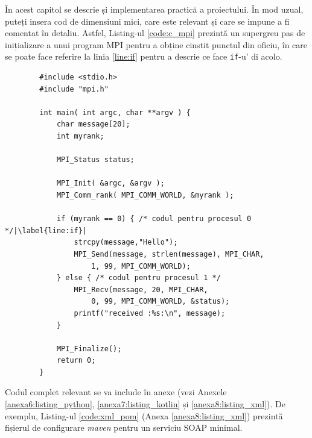 În acest capitol se descrie și implementarea practică a proiectului. În mod uzual, puteți insera cod de dimensiuni mici, care este relevant și care se impune a fi comentat în detaliu. Astfel, Listing-ul \ref{code:c_mpi} prezintă un supergreu pas de inițializare a unui program MPI pentru a obține cinstit punctul din oficiu, în care se poate face referire la linia \ref{line:if} pentru a descrie ce face \verb|if|-u' di acolo.

\begin{code}
    \begin{verbatim}
        #include <stdio.h>
        #include "mpi.h"
        
        int main( int argc, char **argv ) {
        	char message[20];
        	int myrank;	
        		
        	MPI_Status status;
        
        	MPI_Init( &argc, &argv );
        	MPI_Comm_rank( MPI_COMM_WORLD, &myrank );
        	
        	if (myrank == 0) { /* codul pentru procesul 0 */|\label{line:if}|
        		strcpy(message,"Hello");
        		MPI_Send(message, strlen(message), MPI_CHAR, 
        			1, 99, MPI_COMM_WORLD);
        	} else { /* codul pentru procesul 1 */
        		MPI_Recv(message, 20, MPI_CHAR, 
        			0, 99, MPI_COMM_WORLD, &status);
        		printf("received :%s:\n", message);
        	}
        	
        	MPI_Finalize();
        	return 0;
        }
    \end{verbatim}
    \caption{Supercod MPI în C} 
    \label{code:c_mpi}
\end{code}

Codul complet relevant se va include în anexe (vezi Anexele \ref{anexa6:listing_python}, \ref{anexa7:listing_kotlin} și \ref{anexa8:listing_xml}). De exemplu, Listing-ul \ref{code:xml_pom} (Anexa \ref{anexa8:listing_xml}) prezintă fișierul de configurare \textit{maven} pentru un serviciu SOAP minimal.

\textcolor{gray}{\lipsum}

